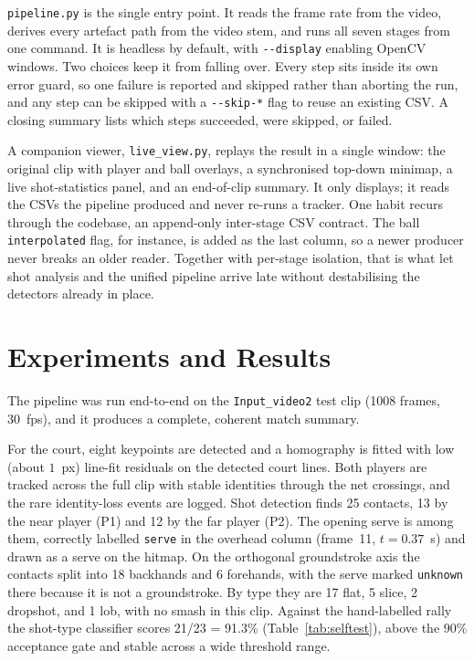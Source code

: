 \documentclass[11pt]{article}
\begin{document}
\texttt{pipeline.py} is the single entry point. It reads the frame rate from the video, derives every artefact path from the video stem, and runs all seven stages from one command. It is headless by default, with \texttt{-{}-display} enabling OpenCV windows. Two choices keep it from falling over. Every step sits inside its own error guard, so one failure is reported and skipped rather than aborting the run, and any step can be skipped with a \texttt{-{}-skip-*} flag to reuse an existing CSV. A closing summary lists which steps succeeded, were skipped, or failed.

A companion viewer, \texttt{live\_view.py}, replays the result in a single window: the original clip with player and ball overlays, a synchronised top-down minimap, a live shot-statistics panel, and an end-of-clip summary. It only displays; it reads the CSVs the pipeline produced and never re-runs a tracker. One habit recurs through the codebase, an append-only inter-stage CSV contract. The ball \texttt{interpolated} flag, for instance, is added as the last column, so a newer producer never breaks an older reader. Together with per-stage isolation, that is what let shot analysis and the unified pipeline arrive late without destabilising the detectors already in place.

\section{Experiments and Results}
The pipeline was run end-to-end on the \texttt{Input\_video2} test clip (1008 frames, 30~fps), and it produces a complete, coherent match summary.

For the court, eight keypoints are detected and a homography is fitted with low (about $1$~px) line-fit residuals on the detected court lines. Both players are tracked across the full clip with stable identities through the net crossings, and the rare identity-loss events are logged. Shot detection finds 25 contacts, 13 by the near player (P1) and 12 by the far player (P2). The opening serve is among them, correctly labelled \texttt{serve} in the overhead column (frame~11, $t=0.37$~s) and drawn as a serve on the hitmap. On the orthogonal groundstroke axis the contacts split into 18 backhands and 6 forehands, with the serve marked \texttt{unknown} there because it is not a groundstroke. By type they are 17 flat, 5 slice, 2 dropshot, and 1 lob, with no smash in this clip. Against the hand-labelled rally the shot-type classifier scores 21/23 = 91.3\% (Table~\ref{tab:selftest}), above the $90\%$ acceptance gate and stable across a wide threshold range.
\end{document}
